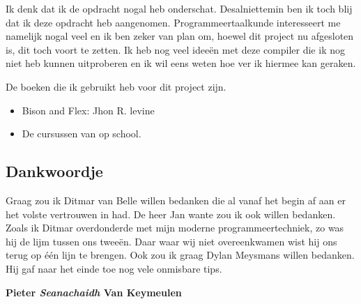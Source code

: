 \documentclass[11pt,a4paper]{article}
\begin{document}
Ik denk dat ik de opdracht nogal heb onderschat. Desalniettemin ben ik toch blij dat ik deze opdracht heb aangenomen. Programmeertaalkunde interesseert me namelijk nogal veel en ik ben zeker van plan om, hoewel dit project nu afgesloten is, dit toch voort te zetten. Ik heb nog veel ideeën met deze compiler die ik nog niet heb kunnen uitproberen en ik wil eens weten hoe ver ik hiermee kan geraken.

De boeken die ik gebruikt heb voor dit project zijn.
\begin{itemize}
\item Bison and Flex: Jhon R. levine
\item De cursussen van op school.
\end{itemize}

\subsection{Dankwoordje}
Graag zou ik Ditmar van Belle willen bedanken die al vanaf het begin af aan er het volste vertrouwen in had. De heer Jan wante zou ik ook willen bedanken. Zoals ik Ditmar overdonderde met mijn moderne programmeertechniek, zo was hij de lijm tussen ons tweeën. Daar waar wij niet overeenkwamen wist hij ons terug op één lijn te brengen. Ook zou ik graag Dylan Meysmans willen bedanken. Hij gaf naar het einde toe nog vele onmisbare tips.

\begin{flushright}
\textbf{Pieter \emph{Seanachaidh} Van Keymeulen}
\end{flushright}
\end{document}
